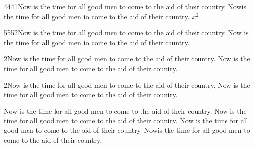 4441Now is the time for all good men to come to the aid of their country. Nowis the time for all good men to come to the aid of their country. $x^2$ %

5552Now is the time for all good men to come to the aid of their country. Now is the time for all good men to come to the aid of their country.%

\begin{myenv}

	2Now is the time for all good men to come to the aid of their country. Now is the time for all good men to come to the aid of their country.%

	2Now is the time for all good men to come to the aid of their country. Now is the time for all good men to come to the aid of their country.%

\end{myenv}

Now is the time for all good men to come to the aid of their country. Now is the time for all good men to come to the aid of their country. Now is the time for all good men to come to the aid of their country. Nowis the time for all good men to come to the aid of their country.%
